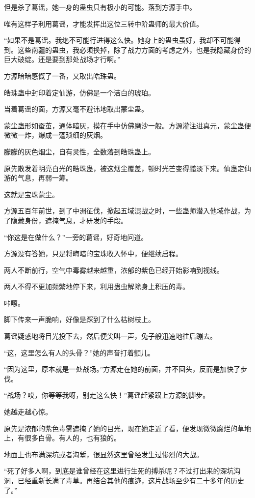 \begin{this_body}
但是杀了葛谣，她一身的蛊虫只有极小的可能。落到方源手中。

唯有这样子利用葛谣，才能发挥出这位三转中阶蛊师的最大价值。

“如果不是葛谣。我绝不可能行进得这么快。她身上的蛊虫虽好，我却不可能得到。这些南疆的蛊虫，我必须换掉，除了战力方面的考虑之外，也是我隐藏身份的巨大破绽。还是要到那处战场才行啊。”

方源暗暗感慨了一番，又取出皓珠蛊。

皓珠蛊中封印着定仙游，仿佛是一个洁白的琥珀。

当着葛谣的面，方源又毫不避讳地取出蒙尘蛊。

蒙尘蛊形如蚕茧，通体暗灰，摸在手中仿佛磨沙一般。方源灌注进真元，蒙尘蛊便微微一炸，爆成一蓬琐细的灰烟。

朦朦的灰色烟尘，自有灵性，全数落到皓珠蛊上。

原先散发着明亮白光的皓珠蛊，被这烟尘覆盖，顿时光芒变得黯淡下来。仙蛊定仙游的气息，再弱一筹。

这就是宝珠蒙尘。

方源五百年前世，到了中洲征伐，掀起五域混战之时，一些蛊师潜入他域作战，为了隐藏身份，遮掩气息，才研发的手段。

“你这是在做什么？”一旁的葛谣，好奇地问道。

方源没有答她，只是将晦暗的宝珠收入怀中，便继续启程。

两人不断前行，空气中毒雾越来越重，浓郁的紫色已经开始影响到视线。

两人不得不更加频繁地停下来，利用蛊虫解除身上积压的毒。

咔嚓。

脚下传来一声脆响，好像是踩到了什么枯树枝上。

葛谣疑惑地将目光投下去，然后便尖叫一声，兔子般迅速地往后蹦去。

“这，这里怎么有人的头骨？”她的声音打着颤儿。

“因为这里，原本就是一处战场。”方源走在她的前面，并不回头，反而是加快了步伐。

“战场？哎，你等等我呀，别走这么快！”葛谣赶紧跟上方源的脚步。

她越走越心惊。

原先是浓郁的紫色毒雾遮掩了她的目光，现在她走近了看，便发现微微腐烂的草地上，有很多白骨。有人的，也有狼的。

地面上也布满深坑或者沟堑，很显然这里曾经发生过惨烈的大战。

“死了好多人啊，到底是谁曾经在这里进行生死的搏杀呢？不过打出来的深坑沟洞，已经重新长满了毒草。再结合其他的痕迹，这片战场至少有二十多年的历史了。”


\end{this_body}
